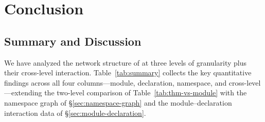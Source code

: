 \section{Conclusion}
\label{sec:conclusion}

\subsection{Summary and Discussion}
\label{sec:summary}
We have analyzed the network structure of  at three levels of granularity plus their cross-level interaction. Table~\ref{tab:summary} collects the key quantitative findings across all four columns---module, declaration, namespace, and cross-level---extending the two-level comparison of Table~\ref{tab:thm-vs-module} with the namespace graph of \S\ref{sec:namespace-graph} and the module--declaration interaction data of \S\ref{sec:module-declaration}.

